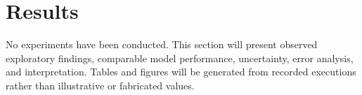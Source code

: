 \section{Results}
No experiments have been conducted. This section will present observed
exploratory findings, comparable model performance, uncertainty, error
analysis, and interpretation. Tables and figures will be generated from
recorded executions rather than illustrative or fabricated values.
